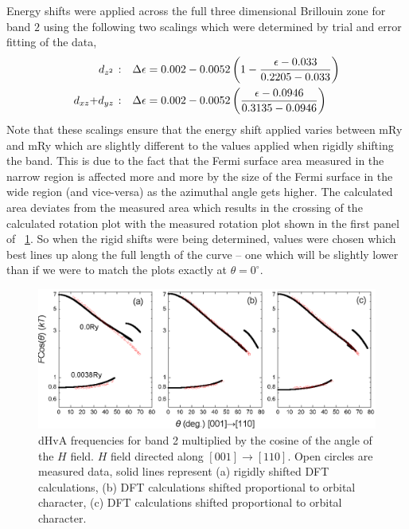 Energy shifts were applied across the full three dimensional Brillouin zone for band $2$ using the following two scalings which were determined by trial and error fitting of the data,
\begin{align*}
\textrm{\DzTwo:}\quad \Delta\epsilon &= 0.002 - 0.0052 \left(1 - \frac{\epsilon - 0.033}{0.2205 - 0.033}\right) \\
\textrm{\DxzDyz:}\quad \Delta\epsilon &= 0.002 - 0.0052 \left(\frac{\epsilon - 0.0946}{0.3135 - 0.0946}\right)
\end{align*}
Note that these scalings ensure that the energy shift applied varies between \unit[-32]{mRy} and \unit[2]{mRy} which are slightly different to the values applied when rigidly shifting the band. This is due to the fact that the Fermi surface area measured in the narrow region is affected more and more by the size of the Fermi surface in the wide region (and vice-versa) as the azimuthal angle gets higher. The calculated area deviates from the measured area which results in the crossing of the calculated rotation plot with the measured rotation plot shown in the first panel of \fig~\ref{Fig:3:Band2DCharacterRigidComparison}. So when the rigid shifts were being determined, values were chosen which best lines up along the full length of the curve -- one which will be slightly lower than if we were to match the plots exactly at $\theta=0^\circ$.

\begin{figure}[htbp]
    \begin{center}
        \includegraphics[scale=0.8]{Chapter3-dHvABaFe2P2/Figures/AngleDepMeasurements/BandCharacterRotPlot/Band2_110_RotPlot_Comparison}
        \caption{dHvA frequencies for band 2 multiplied by the cosine of the angle of the $H$ field. $H$ field directed along $[001]\rightarrow[110]$. Open circles are measured data, solid lines represent (a) rigidly shifted DFT calculations, (b) DFT calculations shifted proportional to \DzTwo orbital character, (c) DFT calculations shifted proportional to \DxzDyz orbital character.}
        \label{Fig:3:Band2DCharacterRigidComparison}
    \end{center}
\end{figure}


